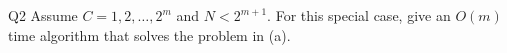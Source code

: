 \begin{problem}
  {Q2}
  Assume $C = 1, 2, \dots, 2^m$ and $N < 2^{m+1}$. For this special case, give an $O(m)$ time algorithm that solves the problem in (a).
\end{problem}
